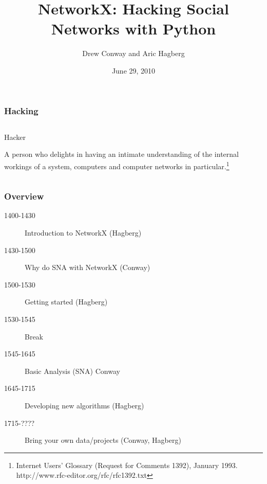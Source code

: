 \documentclass[xcolor=dvipsnames, 9pt]{beamer}
\title{NetworkX: Hacking Social Networks with Python}
\author{Drew Conway and Aric Hagberg}
\date{June 29, 2010}
\begin{document}
\begin{frame}[plain]
\titlepage
\end{frame}

\begin{frame}
\frametitle{Hacking}

\begin{columns}
\begin{column}{0.7\columnwidth}
\LARGE
Hacker

      A person who delights in having an intimate understanding of the
      internal workings of a system, computers and computer networks in
      particular.\footnote{
Internet Users' Glossary (Request for Comments 1392), January 1993.
http://www.rfc-editor.org/rfc/rfc1392.txt}
  
\end{column}
\end{columns}


\end{frame}

\begin{frame}
\frametitle{Overview}

\begin{description}

\item[1400-1430] Introduction to NetworkX (Hagberg)

\item[1430-1500]  Why do SNA with NetworkX (Conway)

\item[1500-1530] Getting started (Hagberg)

\item[1530-1545] Break

\item[1545-1645]  Basic Analysis (SNA) Conway

\item[1645-1715] Developing new algorithms (Hagberg)

\item[1715-????] Bring your own data/projects (Conway, Hagberg)

\end{description}

\end{frame}
\end{document}
